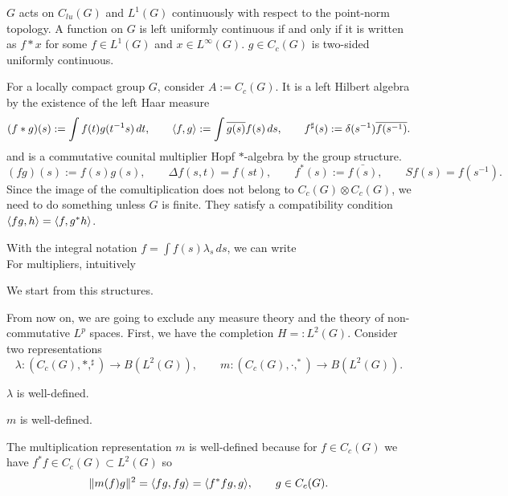 \documentclass{../../large}
\begin{document}
\begin{prb}
$G$ acts on $C_{lu}(G)$ and $L^1(G)$ continuously with respect to the point-norm topology.
A function on $G$ is left uniformly continuous if and only if it is written as $f*x$ for some $f\in L^1(G)$ and $x\in L^\infty(G)$.
$g\in C_c(G)$ is two-sided uniformly continuous.
\end{prb}



\begin{prb}
For a locally compact group $G$, consider $A:=C_c(G)$.
It is a left Hilbert algebra by the existence of the left Haar measure
\[(f*g)(s):=\int f(t)g(t^{-1}s)\,dt,\qquad\langle f,g\rangle:=\int\overline{g(s)}f(s)\,ds,\qquad f^\sharp(s):=\delta(s^{-1})\overline{f(s^{-1})}.\]
and is a commutative counital multiplier Hopf $*$-algebra by the group structure.
\[(fg)(s):=f(s)g(s),\qquad\Delta f(s,t)=f(st),\qquad f^*(s):=\bar{f(s)},\qquad Sf(s)=f(s^{-1}).\]
Since the image of the comultiplication does not belong to $C_c(G)\otimes C_c(G)$, we need to do something unless $G$ is finite.
They satisfy a compatibility condition $\langle fg,h\rangle=\langle f,g^*h\rangle$.

With the integral notation $f=\int f(s)\lambda_s\,ds$, we can write
\[\]
For multipliers, intuitively

We start from this structures.

From now on, we are going to exclude any measure theory and the theory of non-commutative $L^p$ spaces.
First, we have the completion $H=:L^2(G)$.
Consider two representations
\[\lambda:(C_c(G),*,^\sharp)\to B(L^2(G)),\qquad m:(C_c(G),\cdot,^*)\to B(L^2(G)).\]
\begin{parts}
\item $\lambda$ is well-defined.
\item $m$ is well-defined.
\end{parts}
\end{prb}
\begin{pf}
The multiplication representation $m$ is well-defined because for $f\in C_c(G)$ we have $f^*f\in C_c(G)\subset L^2(G)$ so
\[\|m(f)g\|^2=\langle fg,fg\rangle=\langle f^*fg,g\rangle,\qquad g\in C_c(G).\]
\end{pf}


\section{}
\end{document}
